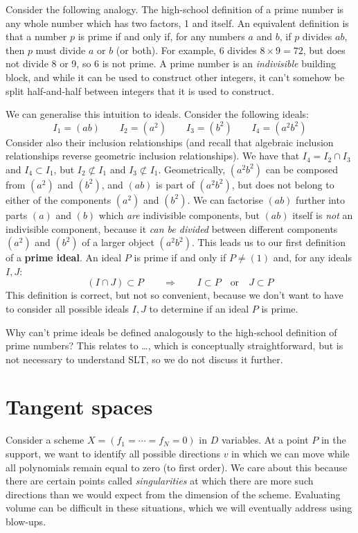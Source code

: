\documentclass[12pt]{article}
\begin{document}
Consider the following analogy. The high-school definition of a prime number is any whole number which has two factors, 1 and itself. An equivalent definition is that a number $p$ is prime if and only if, for any numbers $a$ and $b$, if $p$ divides $ab$, then $p$ must divide $a$ or $b$ (or both). For example, 6 divides $8\times 9=72$, but does not divide 8 or 9, so 6 is not prime. A prime number is an \emph{indivisible} building block, and while it can be used to construct other integers, it can't somehow be split half-and-half between integers that it is used to construct.

We can generalise this intuition to ideals. Consider the following ideals:
\[
I_1=(ab) \qquad I_2=(a^2) \qquad I_3=(b^2) \qquad I_4=(a^2b^2)
\]
Consider also their inclusion relationships (and recall that algebraic inclusion relationships reverse geometric inclusion relationships). We have that $I_4=I_2\cap I_3$ and $I_4\subset I_1$, but $I_2 \not\subset I_1$ and $I_3 \not\subset I_1$. Geometrically, $(a^2b^2)$ can be composed from $(a^2)$ and $(b^2)$, and $(ab)$ is part of $(a^2b^2)$, but does not belong to either of the components $(a^2)$ and $(b^2)$. We can factorise $(ab)$ further into parts $(a)$ and $(b)$ which \emph{are} indivisible components, but $(ab)$ itself is \emph{not} an indivisible component, because it \emph{can be divided} between different components $(a^2)$ and $(b^2)$ of a larger object $(a^2b^2)$. This leads us to our first definition of a \textbf{prime ideal}. An ideal $P$ is prime if and only if $P\ne (1)$ and, for any ideals $I,J$:
\[
(I\cap J)\subset P \qquad \Longrightarrow \qquad I\subset P \quad \text{or} \quad J\subset P
\]
This definition is correct, but not so convenient, because we don't want to have to consider all possible ideals $I,J$ to determine if an ideal $P$ is prime.

Why can't prime ideals be defined analogously to the high-school definition of prime numbers? This relates to \dots , which is conceptually straightforward, but is not necessary to understand SLT, so we do not discuss it further.

\newpage
\section{Tangent spaces}\label{tangent-spaces}

Consider a scheme $X=(f_1=\cdots=f_N=0)$ in $D$ variables. At a point $P$ in the support, we want to identify all possible directions $v$ in which we can move while all polynomials remain equal to zero (to first order). We care about this because there are certain points called \emph{singularities} at which there are more such directions than we would expect from the dimension of the scheme. Evaluating volume can be difficult in these situations, which we will eventually address using blow-ups.
\end{document}
